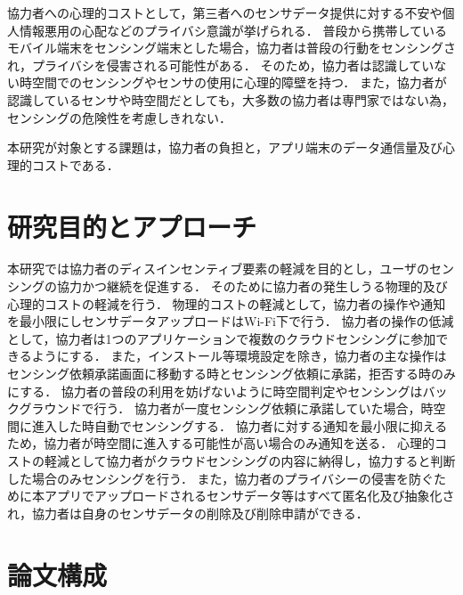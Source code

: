 協力者への心理的コストとして，第三者へのセンサデータ提供に対する不安や個人情報悪用の心配などのプライバシ意識が挙げられる．
普段から携帯しているモバイル端末をセンシング端末とした場合，協力者は普段の行動をセンシングされ，プライバシを侵害される可能性がある．
そのため，協力者は認識していない時空間でのセンシングやセンサの使用に心理的障壁を持つ．
また，協力者が認識しているセンサや時空間だとしても，大多数の協力者は専門家ではない為，センシングの危険性を考慮しきれない．

本研究が対象とする課題は，協力者の負担と，アプリ端末のデータ通信量及び心理的コストである．


\section{研究目的とアプローチ}
\label{sec:thesis}

本研究では協力者のディスインセンティブ要素の軽減を目的とし，ユーザのセンシングの協力かつ継続を促進する．
そのために協力者の発生しうる物理的及び心理的コストの軽減を行う．
物理的コストの軽減として，協力者の操作や通知を最小限にしセンサデータアップロードはWi-Fi下で行う．
協力者の操作の低減として，協力者は1つのアプリケーションで複数のクラウドセンシングに参加できるようにする．
また，インストール等環境設定を除き，協力者の主な操作はセンシング依頼承諾画面に移動する時とセンシング依頼に承諾，拒否する時のみにする．
協力者の普段の利用を妨げないように時空間判定やセンシングはバックグラウンドで行う．
協力者が一度センシング依頼に承諾していた場合，時空間に進入した時自動でセンシングする．
協力者に対する通知を最小限に抑えるため，協力者が時空間に進入する可能性が高い場合のみ通知を送る．
心理的コストの軽減として協力者がクラウドセンシングの内容に納得し，協力すると判断した場合のみセンシングを行う．
また，協力者のプライバシーの侵害を防ぐために本アプリでアップロードされるセンサデータ等はすべて匿名化及び抽象化され，協力者は自身のセンサデータの削除及び削除申請ができる．


\section{論文構成}
\label{sec:presentation}

